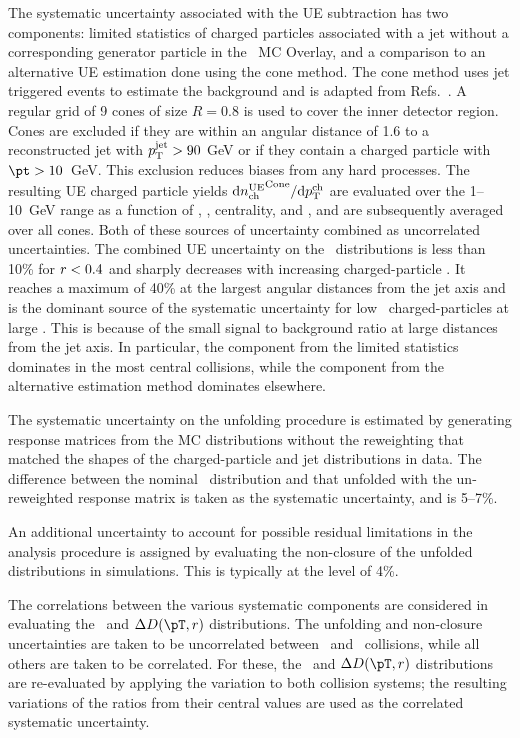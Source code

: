 The systematic uncertainty associated with the UE subtraction has two components: limited statistics of charged particles associated with a jet without a corresponding generator particle in the \pbpb\ MC Overlay, and a comparison to an alternative UE estimation done using the cone method.
The cone method uses jet triggered events to estimate the background and is adapted from Refs.~\cite{Aaboud:2018hpb, Aaboud:2017bzv}.
A regular grid of 9 cones of size $R = 0.8$ is used to cover the inner detector region.
Cones are excluded if they are within an angular distance of 1.6 to a reconstructed jet with $\mbox{$p_{\mathrm{T}}^{\mathrm{jet}}$} > 90$ GeV or if they contain a charged particle with \mbox{$\pt > 10$ GeV}.
This exclusion reduces biases from any hard processes.
The resulting UE charged particle yields $\mathrm{d} \mbox{$n_{\mathrm{ch}}^{\mathrm{UE}}$}^{\mathrm{Cone}}/ \mathrm{d} \mbox{$p_{{\mathrm{T}}}^{\mathrm{ch}}$}$ are evaluated over the \mbox{1--10 GeV} range as a function of \pttrk, \ptjet, centrality, and \rvar, and are subsequently averaged over all cones.
Both of these sources of uncertainty combined as uncorrelated uncertainties.
The combined UE uncertainty on the \Dptr\ distributions is less than 10\% for $\mbox{$r$} < 0.4$ and sharply decreases with increasing charged-particle \pT.
It reaches a maximum of 40\% at the largest angular distances from the jet axis and is the dominant source of the systematic uncertainty for low \pt\ charged-particles at large \rvar.
This is because of the small signal to background ratio at large distances from the jet axis.
In particular, the component from the limited statistics dominates in the most central collisions, while the component from the alternative estimation method dominates elsewhere.


The systematic uncertainty on the unfolding procedure is estimated by generating response matrices from the MC distributions without the reweighting that matched the shapes of the charged-particle and jet distributions in data.
The difference between the nominal \Dptr\ distribution and that unfolded with the un-reweighted response matrix is taken as the systematic uncertainty, and is 5--7\%.

An additional uncertainty to account for possible residual limitations in the analysis procedure is assigned by evaluating the non-closure of the unfolded distributions in simulations.
This is typically at the level of 4\%.

The correlations between the various systematic components are considered in evaluating the \RDptr\ and $\Delta\Dptr$ distributions.
The unfolding and non-closure uncertainties are taken to be uncorrelated between \pp\ and \pbpb\ collisions, while all others are taken to be correlated.
For these, the \RDptr\ and $\Delta\Dptr$ distributions are re-evaluated by applying the variation to both collision systems; the resulting variations of the ratios from their central values are used as the correlated systematic uncertainty.


